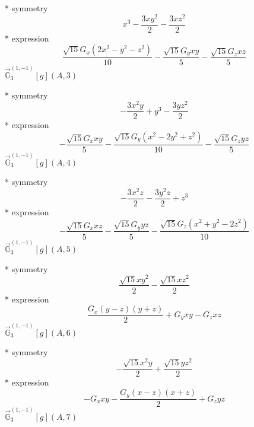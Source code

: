\documentclass[fleqn,8pt]{jsarticle}
\begin{document}
\noindent\quad ** symmetry
\begin{dmath*}
x^{3} - \frac{3 x y^{2}}{2} - \frac{3 x z^{2}}{2}
\end{dmath*}
\noindent\quad ** expression
\begin{dmath*}
\frac{\sqrt{15} G_{x} \left(2 x^{2} - y^{2} - z^{2}\right)}{10} - \frac{\sqrt{15} G_{y} x y}{5} - \frac{\sqrt{15} G_{z} x z}{5}
\end{dmath*}
\noindent\quad $\vec{\mathbb{G}}_{3}^{(1,-1)}[g](A,3)$

\noindent\quad ** symmetry
\begin{dmath*}
- \frac{3 x^{2} y}{2} + y^{3} - \frac{3 y z^{2}}{2}
\end{dmath*}
\noindent\quad ** expression
\begin{dmath*}
- \frac{\sqrt{15} G_{x} x y}{5} - \frac{\sqrt{15} G_{y} \left(x^{2} - 2 y^{2} + z^{2}\right)}{10} - \frac{\sqrt{15} G_{z} y z}{5}
\end{dmath*}
\noindent\quad $\vec{\mathbb{G}}_{3}^{(1,-1)}[g](A,4)$

\noindent\quad ** symmetry
\begin{dmath*}
- \frac{3 x^{2} z}{2} - \frac{3 y^{2} z}{2} + z^{3}
\end{dmath*}
\noindent\quad ** expression
\begin{dmath*}
- \frac{\sqrt{15} G_{x} x z}{5} - \frac{\sqrt{15} G_{y} y z}{5} - \frac{\sqrt{15} G_{z} \left(x^{2} + y^{2} - 2 z^{2}\right)}{10}
\end{dmath*}
\noindent\quad $\vec{\mathbb{G}}_{3}^{(1,-1)}[g](A,5)$

\noindent\quad ** symmetry
\begin{dmath*}
\frac{\sqrt{15} x y^{2}}{2} - \frac{\sqrt{15} x z^{2}}{2}
\end{dmath*}
\noindent\quad ** expression
\begin{dmath*}
\frac{G_{x} \left(y - z\right) \left(y + z\right)}{2} + G_{y} x y - G_{z} x z
\end{dmath*}
\noindent\quad $\vec{\mathbb{G}}_{3}^{(1,-1)}[g](A,6)$

\noindent\quad ** symmetry
\begin{dmath*}
- \frac{\sqrt{15} x^{2} y}{2} + \frac{\sqrt{15} y z^{2}}{2}
\end{dmath*}
\noindent\quad ** expression
\begin{dmath*}
- G_{x} x y - \frac{G_{y} \left(x - z\right) \left(x + z\right)}{2} + G_{z} y z
\end{dmath*}
\noindent\quad $\vec{\mathbb{G}}_{3}^{(1,-1)}[g](A,7)$
\end{document}
